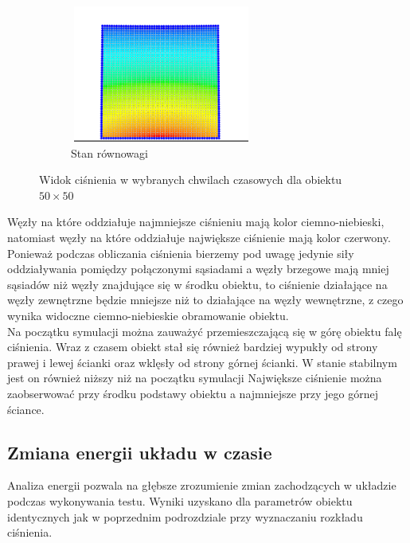 \documentclass[12pt, letterpaper]{report}
\begin{document}
\begin{figure}[h]
        \begin{subfigure}{0.5\textwidth}
            \centering
            \includegraphics[width=6cm, height=4.5cm]{pressure_04.png}
            \caption{Stan równowagi}
        \end{subfigure}
        
        \caption{Widok ciśnienia w wybranych chwilach czasowych dla obiektu $50 \times 50$}
    \end{figure}

    Węzły na które oddziałuje najmniejsze ciśnieniu mają kolor ciemno-niebieski, natomiast węzły na które oddziałuje 
    największe ciśnienie mają kolor czerwony. Ponieważ podczas obliczania ciśnienia bierzemy pod uwagę jedynie 
    siły oddziaływania pomiędzy połączonymi sąsiadami a węzły brzegowe mają mniej sąsiadów niż węzły znajdujące
    się w środku obiektu, to ciśnienie działające na węzły zewnętrzne będzie mniejsze niż to działające na
    węzły wewnętrzne, z czego wynika widoczne ciemno-niebieskie obramowanie obiektu. \\

    Na początku symulacji można zauważyć przemieszczającą się w górę obiektu falę ciśnienia. Wraz z czasem 
    obiekt stał się również bardziej wypukły od strony prawej i lewej ścianki
    oraz wklęsły od strony górnej ścianki. W stanie stabilnym jest on również niższy niż na początku symulacji 
    Największe ciśnienie można zaobserwować przy środku podstawy obiektu a najmniejsze przy jego 
    górnej ściance.

    \subsection{Zmiana energii układu w czasie}
    Analiza energii pozwala na głębsze zrozumienie zmian zachodzących w układzie podczas
    wykonywania testu. Wyniki uzyskano dla parametrów obiektu identycznych jak w poprzednim podrozdziale
    przy wyznaczaniu rozkładu ciśnienia.
\end{document}
